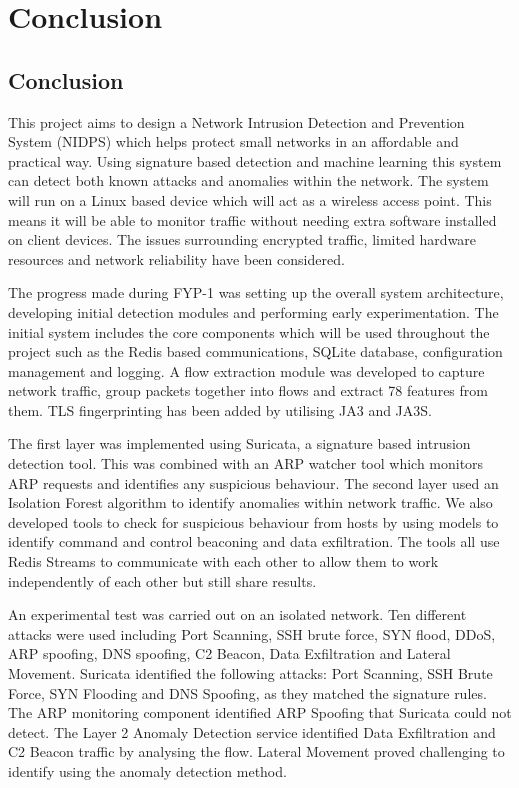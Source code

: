 \chapter{Conclusion}\label{chap:10}

\section{Conclusion}\label{sec:10.1}

\noindent This project aims to design a Network Intrusion Detection and Prevention System (NIDPS) which helps protect small networks in an affordable and practical way. Using signature based detection and machine learning this system can detect both known attacks and anomalies within the network. The system will run on a Linux based device which will act as a wireless access point. This means it will be able to monitor traffic without needing extra software installed on client devices. The issues surrounding encrypted traffic, limited hardware resources and network reliability have been considered.

\noindent The progress made during FYP-1 was setting up the overall system architecture, developing initial detection modules and performing early experimentation. The initial system includes the core components which will be used throughout the project such as the Redis based communications, SQLite database, configuration management and logging. A flow extraction module was developed to capture network traffic, group packets together into flows and extract 78 features from them. TLS fingerprinting has been added by utilising JA3 and JA3S.

\noindent The first layer was implemented using Suricata, a signature based intrusion detection tool. This was combined with an ARP watcher tool which monitors ARP requests and identifies any suspicious behaviour. The second layer used an Isolation Forest algorithm to identify anomalies within network traffic. We also developed tools to check for suspicious behaviour from hosts by using models to identify command and control beaconing and data exfiltration. The tools all use Redis Streams to communicate with each other to allow them to work independently of each other but still share results.

\noindent An experimental test was carried out on an isolated network. Ten different attacks were used including Port Scanning, SSH brute force, SYN flood, DDoS, ARP spoofing, DNS spoofing, C2 Beacon, Data Exfiltration and Lateral Movement. Suricata identified the following attacks: Port Scanning, SSH Brute Force, SYN Flooding and DNS Spoofing, as they matched the signature rules. The ARP monitoring component identified ARP Spoofing that Suricata could not detect. The Layer 2 Anomaly Detection service identified Data Exfiltration and C2 Beacon traffic by analysing the flow. Lateral Movement proved challenging to identify using the anomaly detection method.

